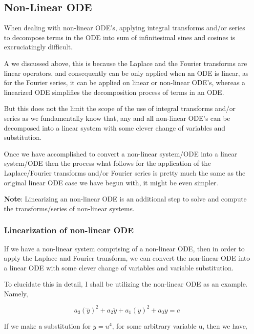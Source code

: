 

\subsection{{Non-Linear ODE}}

	{When dealing with non-linear ODE's, applying integral transforms and/or series to decompose terms in the ODE into sum of infinitesimal sines and cosines is excruciatingly difficult.}

	{A we discussed above, this is because the Laplace and the Fourier transforms are linear operators, and consequently can be only applied when an ODE is linear, as for the Fourier series, it can be applied on linear or non-linear ODE's, whereas a linearized ODE simplifies the decomposition process of terms in an ODE.}

	{But this does not the limit the scope of the use of integral transforms and/or series as we fundamentally know that, any and all non-linear ODE's can be decomposed into a linear system with some clever change of variables and substitution.}

	{Once we have accomplished to convert a non-linear system/ODE into a linear system/ODE then the process what follows for the application of the Laplace/Fourier transforms and/or Fourier series is pretty much the same as the original linear ODE case we have begun with, it might be even simpler.}

	{\textbf{Note}: Linearizing an non-linear ODE is an additional step to solve and compute the transforms/series of non-linear systems.}

	\subsubsection{{Linearization of non-linear ODE}}
		
		{If we have a non-linear system comprising of a non-linear ODE, then in order to apply the Laplace and Fourier transform, we can convert the non-linear ODE into a linear ODE with some clever change of variables and variable substitution.}		
		
		{To elucidate this in detail, I shall be utilizing the non-linear ODE as an example. Namely,}		
		
			$$a_3\left(\dddot{y}\right)^2 + a_2\ddot{y} + a_1\left(\dot{y}\right)^2 + a_0y = c$$		
		
		{If we make a substitution for $y = u^4$, for some arbitrary variable u, then we have,}		
		

